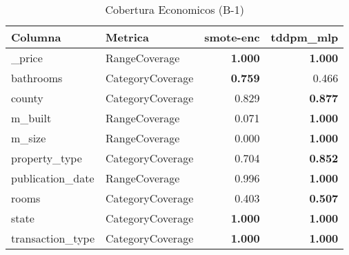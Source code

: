\begin{table}[H]
\centering
\caption{Cobertura Economicos (B-1)}
\label{table-coverage-economicos-b-1}
\begin{tabular}{|l|l|r|r|}
\hline
\rowcolor[gray]{0.8}
Columna & Metrica & smote-enc & tddpm\_mlp \\
\hline \_price & RangeCoverage & \bfseries 1.000 & \bfseries 1.000 \\
\hline bathrooms & CategoryCoverage & \bfseries 0.759 & 0.466 \\
\hline county & CategoryCoverage & 0.829 & \bfseries 0.877 \\
\hline m\_built & RangeCoverage & 0.071 & \bfseries 1.000 \\
\hline m\_size & RangeCoverage & 0.000 & \bfseries 1.000 \\
\hline property\_type & CategoryCoverage & 0.704 & \bfseries 0.852 \\
\hline publication\_date & RangeCoverage & 0.996 & \bfseries 1.000 \\
\hline rooms & CategoryCoverage & 0.403 & \bfseries 0.507 \\
\hline state & CategoryCoverage & \bfseries 1.000 & \bfseries 1.000 \\
\hline transaction\_type & CategoryCoverage & \bfseries 1.000 & \bfseries 1.000 \\
\hline
\end{tabular}
\end{table}
